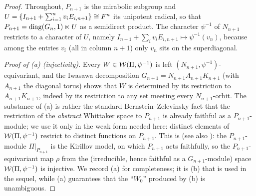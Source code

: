 \begin{proof}
Throughout, $P_{n+1}$ is the mirabolic subgroup and
$U=\{I_{n+1}+\sum_{i=1}^n v_iE_{i,n+1}\}\cong F^n$ its unipotent radical, so that
$P_{n+1}=\operatorname{diag}(G_n,1)\ltimes U$ as a semidirect product. The character $\psi^{-1}$ of
$N_{n+1}$ restricts to a character of $U$, namely $I_{n+1}+\sum_i v_iE_{i,n+1}\mapsto
\psi^{-1}(v_n)$, because among the entries $v_i$ \textup{(}all in column $n+1$\textup{)} only
$v_n$ sits on the superdiagonal.

\smallskip
\emph{Proof of \textup{(a)} \textup{(}injectivity\textup{)}.}
Every $W\in\mathcal{W}(\Pi,\psi^{-1})$ is left $(N_{n+1},\psi^{-1})$-equivariant, and the Iwasawa
decomposition $G_{n+1}=N_{n+1}A_{n+1}K_{n+1}$ \textup{(}with $A_{n+1}$ the diagonal torus\textup{)}
shows that $W$ is determined by its restriction to $A_{n+1}K_{n+1}$, indeed by its restriction to
any set meeting every $N_{n+1}$-orbit. The substance of \textup{(a)} is rather the standard
Bernstein--Zelevinsky fact that the restriction of the \emph{abstract} Whittaker space to
$P_{n+1}$ is already faithful as a $P_{n+1}$-module; we use it only in the weak form needed here:
distinct elements of $\mathcal{W}(\Pi,\psi^{-1})$ restrict to distinct functions on $P_{n+1}$. This is
\cite[2.5,~3.5]{Bernstein} \textup{(}see also \cite[(2.1)]{JPSS83}\textup{)}: the
$P_{n+1}$-module $\Pi|_{P_{n+1}}$ is the Kirillov model, on which $P_{n+1}$ acts faithfully, so the
$P_{n+1}$-equivariant map $\rho$ from the \textup{(}irreducible, hence faithful as a
$G_{n+1}$-module\textup{)} space $\mathcal{W}(\Pi,\psi^{-1})$ is injective. We record \textup{(a)} for
completeness; it is \textup{(b)} that is used in the sequel, while \textup{(a)} guarantees that the
``$W_0$'' produced by \textup{(b)} is unambiguous.


\end{proof}
